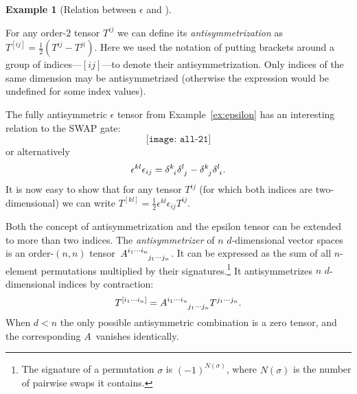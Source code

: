 \documentclass[aps,pra,12pt,nofootinbib,superscriptaddress,longbibliography]{revtex4-1}
\newcommand{\jb}[1]{\todo[inline]{{\textbf{[}JB: #1\textbf{]}}}}
\theoremstyle{plain}
\theoremstyle{definition}
\newtheorem{example}[theorem]{Example}
\newcommand{\swap}{{\sf{SWAP}}}
\newcommand{\be}{\begin{equation}}
\newcommand{\ee}{\end{equation}}
\begin{document}
\begin{example}[Relation between $\epsilon$ and \swap]\label{ex:spinor}


For any order-$2$ tensor $T^{ij}$ we can define its \emph{antisymmetrization}
as $T^{[ij]} = \frac{1}{2}(T^{ij}-T^{ji})$.
Here we used the notation of putting brackets around a group of indices---$[ij]$---to denote their antisymmetrization. 
Only indices of the same dimension may be antisymmetrized
(otherwise the expression would be undefined for some index values).

The fully antisymmetric $\epsilon$ tensor from Example~\ref{ex:epsilon}
has an interesting relation to the SWAP gate:
\be\label{eqn:spinor}
 \texttt{[image: all-21]}
\ee
or alternatively
\begin{equation}
\epsilon^{kl} \epsilon_{ij} =
\delta\indices{^k_i} \delta\indices{^l_j} -\delta\indices{^k_j} \delta\indices{^l_i}.
\end{equation}
It is now easy to show that for any tensor $T^{ij}$
(for which both indices are two-dimensional)
we can write
$T^{[kl]} = \frac{1}{2}\epsilon^{kl} \epsilon_{ij} T^{ij}$.

Both the concept of antisymmetrization and the epsilon tensor can be extended to more than two indices.
The \emph{antisymmetrizer} of $n$ $d$-dimensional vector spaces
is an order-$(n,n)$ tensor~$A\indices{^{i_1\cdots i_n}_{j_1 \cdots j_n}}$.
It can be expressed as the sum of all $n$-element permutations multiplied by their signatures.\footnote{The signature of a permutation $\sigma$ is $(-1)^{N(\sigma)}$, where $N(\sigma)$ is the number of pairwise swaps it contains.}
It antisymmetrizes $n$ $d$-dimensional indices by contraction:
\be
T^{[i_1\cdots i_n]} = A\indices{^{i_1\cdots i_n}_{j_1 \cdots j_n}} T^{j_1 \cdots j_n}.
\ee
When $d<n$ the only possible antisymmetric combination is a zero tensor,
and the corresponding $A$~vanishes identically.

\begin{comment}
$\frac{1}{n!} \sum_{\sigma \in S_n} (-1)^{N(\sigma)} T_\sigma$,
a properly scaled sum of all $n$-element permutations of $d$-dimensional vector spaces, multiplied by
their signatures\footnote{The signature of a permutation $\sigma$ is $(-1)^{N(\sigma)}$, where $N(\sigma)$ is the
number of pairwise swaps it contains.}
\end{comment}


\end{example}
\end{document}
